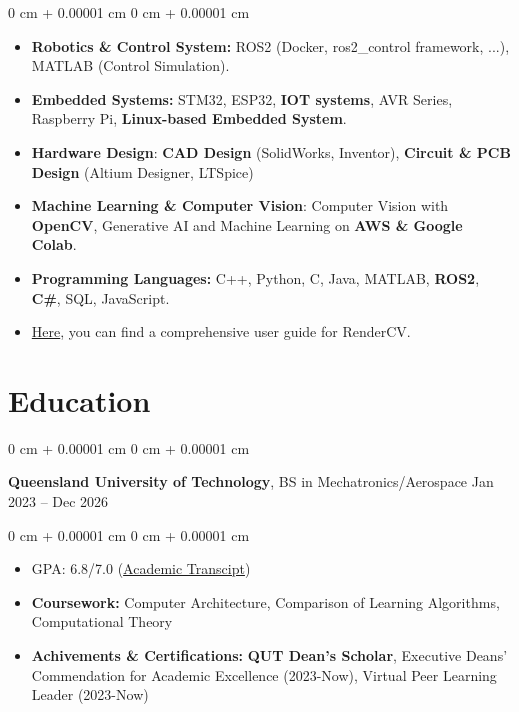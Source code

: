 \documentclass[10pt, letterpaper]{article}
\newenvironment{highlights}{
    \begin{itemize}[
        topsep=0.10 cm,
        parsep=0.10 cm,
        partopsep=0pt,
        itemsep=0pt,
        leftmargin=0 cm + 10pt
    ]
}{
    \end{itemize}
} %
\newenvironment{highlightsforbulletentries}{
    \begin{itemize}[
        topsep=0.10 cm,
        parsep=0.10 cm,
        partopsep=0pt,
        itemsep=0pt,
        leftmargin=10pt
    ]
}{
    \end{itemize}
} %
\newenvironment{onecolentry}{
    \begin{adjustwidth}{
        0 cm + 0.00001 cm
    }{
        0 cm + 0.00001 cm
    }
}{
    \end{adjustwidth}
} %
\newenvironment{twocolentry}[2][]{
    \onecolentry
    \def\secondColumn{#2}
    \setcolumnwidth{\fill, 4.5 cm}
    \begin{paracol}{2}
}{
    \switchcolumn \raggedleft \secondColumn
    \end{paracol}
    \endonecolentry
} %
\begin{document}
\begin{onecolentry}
      \begin{highlightsforbulletentries}

            \item \textbf{Robotics \& Control System:} ROS2 (Docker, ros2\_control framework, ...), MATLAB (Control Simulation).
            \item \textbf{Embedded Systems:} STM32, ESP32, \textbf{IOT systems}, AVR Series, Raspberry Pi, \textbf{Linux-based Embedded System}.

            \item \textbf{Hardware Design}: \textbf{CAD Design} (SolidWorks, Inventor), \textbf{Circuit \& PCB Design} (Altium Designer, LTSpice)
            \item \textbf{Machine Learning \& Computer Vision}: Computer Vision with \textbf{OpenCV}, Generative AI and Machine Learning on \textbf{AWS \& Google Colab}.

            \item \textbf{Programming Languages:} C++, Python, C, Java, MATLAB, \textbf{ROS2}, \textbf{C\#}, SQL, JavaScript.


            \item \href{https://docs.rendercv.com/user_guide/}{Here}, you can find a comprehensive user guide for RenderCV.

      \end{highlightsforbulletentries}
\end{onecolentry}

\section{Education}

\begin{twocolentry}{
            Jan 2023 – Dec 2026
      }
      \textbf{Queensland University of Technology}, BS in Mechatronics/Aerospace\end{twocolentry}

\vspace{0.10 cm}
\begin{onecolentry}
      \begin{highlights}
            \item GPA: 6.8/7.0 (\href{https://example.com}{Academic Transcipt})
            \item \textbf{Coursework:} Computer Architecture, Comparison of Learning Algorithms, Computational Theory
            \item \textbf{Achivements \& Certifications:} \textbf{QUT Dean's Scholar}, 
            Executive Deans' Commendation for Academic Excellence (2023-Now),
            Virtual Peer Learning Leader (2023-Now)

      \end{highlights}
\end{onecolentry}
\end{document}

